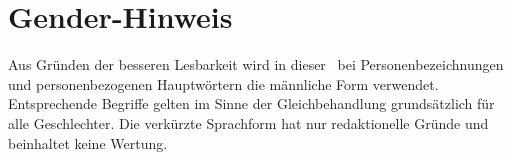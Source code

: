 
\cleardoublepage

\chapter*{Gender-Hinweis}
\thispagestyle{plain}

Aus Gründen der besseren Lesbarkeit wird in dieser \myworktype ~bei Personenbezeichnungen und personenbezogenen Hauptwörtern die männliche Form verwendet. Entsprechende Begriffe gelten im Sinne der Gleichbehandlung grundsätzlich für alle Geschlechter. Die verkürzte Sprachform hat nur redaktionelle Gründe und beinhaltet keine Wertung.

\newpage